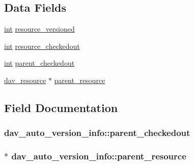 \subsection*{Data Fields}
\begin{DoxyCompactItemize}
\item 
\hyperlink{pcre_8txt_a42dfa4ff673c82d8efe7144098fbc198}{int} \hyperlink{structdav__auto__version__info_a34883b8aa84af307dd0504c0c3900037}{resource\+\_\+versioned}
\item 
\hyperlink{pcre_8txt_a42dfa4ff673c82d8efe7144098fbc198}{int} \hyperlink{structdav__auto__version__info_ad2830862ef4ed4bc05fd923371ebc95f}{resource\+\_\+checkedout}
\item 
\hyperlink{pcre_8txt_a42dfa4ff673c82d8efe7144098fbc198}{int} \hyperlink{structdav__auto__version__info_ac73d49502ec67b10c8ccf4338c64b443}{parent\+\_\+checkedout}
\item 
\hyperlink{structdav__resource}{dav\+\_\+resource} $\ast$ \hyperlink{structdav__auto__version__info_a6826c07767a1368ced0781ddecc042de}{parent\+\_\+resource}
\end{DoxyCompactItemize}


\subsection{Field Documentation}
\subsubsection[{\texorpdfstring{parent\+\_\+checkedout}{parent_checkedout}}]{ dav\+\_\+auto\+\_\+version\+\_\+info\+::parent\+\_\+checkedout}\hypertarget{structdav__auto__version__info_ac73d49502ec67b10c8ccf4338c64b443}{}\label{structdav__auto__version__info_ac73d49502ec67b10c8ccf4338c64b443}
\subsubsection[{\texorpdfstring{parent\+\_\+resource}{parent_resource}}]{$\ast$ dav\+\_\+auto\+\_\+version\+\_\+info\+::parent\+\_\+resource}\hypertarget{structdav__auto__version__info_a6826c07767a1368ced0781ddecc042de}{}\label{structdav__auto__version__info_a6826c07767a1368ced0781ddecc042de}
